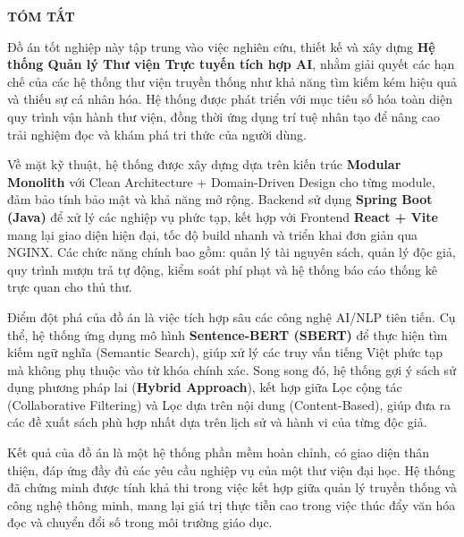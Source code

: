 \thispagestyle{empty}
{}

\noindent
\vspace{0.2cm}
\begin{center}
    \textbf{\LARGE TÓM TẮT}
\end{center}
\vspace{1cm} %


Đồ án tốt nghiệp này tập trung vào việc nghiên cứu, thiết kế và xây dựng \textbf{Hệ thống Quản lý Thư viện Trực tuyến tích hợp AI}, nhằm giải quyết các hạn chế của các hệ thống thư viện truyền thống như khả năng tìm kiếm kém hiệu quả và thiếu sự cá nhân hóa. Hệ thống được phát triển với mục tiêu số hóa toàn diện quy trình vận hành thư viện, đồng thời ứng dụng trí tuệ nhân tạo để nâng cao trải nghiệm đọc và khám phá tri thức của người dùng.

Về mặt kỹ thuật, hệ thống được xây dựng dựa trên kiến trúc \textbf{Modular Monolith} với Clean Architecture + Domain-Driven Design cho từng module, đảm bảo tính bảo mật và khả năng mở rộng. Backend sử dụng \textbf{Spring Boot (Java)} để xử lý các nghiệp vụ phức tạp, kết hợp với Frontend \textbf{React + Vite} mang lại giao diện hiện đại, tốc độ build nhanh và triển khai đơn giản qua NGINX. Các chức năng chính bao gồm: quản lý tài nguyên sách, quản lý độc giả, quy trình mượn trả tự động, kiểm soát phí phạt và hệ thống báo cáo thống kê trực quan cho thủ thư.

Điểm đột phá của đồ án là việc tích hợp sâu các công nghệ AI/NLP tiên tiến. Cụ thể, hệ thống ứng dụng mô hình \textbf{Sentence-BERT (SBERT)} để thực hiện tìm kiếm ngữ nghĩa (Semantic Search), giúp xử lý các truy vấn tiếng Việt phức tạp mà không phụ thuộc vào từ khóa chính xác. Song song đó, hệ thống gợi ý sách sử dụng phương pháp lai (\textbf{Hybrid Approach}), kết hợp giữa Lọc cộng tác (Collaborative Filtering) và Lọc dựa trên nội dung (Content-Based), giúp đưa ra các đề xuất sách phù hợp nhất dựa trên lịch sử và hành vi của từng độc giả.

Kết quả của đồ án là một hệ thống phần mềm hoàn chỉnh, có giao diện thân thiện, đáp ứng đầy đủ các yêu cầu nghiệp vụ của một thư viện đại học. Hệ thống đã chứng minh được tính khả thi trong việc kết hợp giữa quản lý truyền thống và công nghệ thông minh, mang lại giá trị thực tiễn cao trong việc thúc đẩy văn hóa đọc và chuyển đổi số trong môi trường giáo dục.
